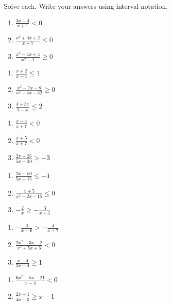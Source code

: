 Solve each. Write your answers using interval notation.
\begin{multicols}{3}
\begin{enumerate}
\setlength\itemsep{10pt}
\item $\frac{3x-4}{x+1}<0$
\item $\frac{x^2+3x+2}{x-7} \leq 0$
\item $\frac{x^2-4x+4}{x^2-1} \geq 0$
\end{enumerate} \setcounter{Review}{\value{enumi}}
\end{multicols}
\begin{multicols}{3}
\begin{enumerate}	\setcounter{enumi}{\value{Review}}
\item $\frac{x+2}{x-4} \leq 1$
\item $\frac{x^2-7x-8}{x^2-4x-32} \geq 0$
\item $\frac{4+3x}{5-x} \leq 2$
\end{enumerate} \setcounter{Review}{\value{enumi}}
\end{multicols}
\begin{multicols}{3}
\begin{enumerate}	\setcounter{enumi}{\value{Review}}
\item $\frac{x-4}{x+7} < 0$
\item $\frac{x+5}{x+7} < 0$
\item $\frac{2x-26}{5x+20} > -3$
\end{enumerate} \setcounter{Review}{\value{enumi}}
\end{multicols}
\begin{multicols}{3}
\begin{enumerate}	\setcounter{enumi}{\value{Review}}
\item $\frac{2x-50}{5x+15} \leq -1$
\item $\frac{x+5}{x^2-2x-15} \leq 0$
\item $-\frac{2}{x} \geq - \frac{3}{x+1}$
\end{enumerate} \setcounter{Review}{\value{enumi}}
\end{multicols}
\begin{multicols}{3}
\begin{enumerate}	\setcounter{enumi}{\value{Review}}
\item $-\frac{3}{x+6} > -\frac{4}{x+7}$
\item $\frac{2x^2+3x-2}{x^2+5x+6} < 0$
\item $\frac{x-4}{2x+4} \geq 1$
\end{enumerate}	\setcounter{Review}{\value{enumi}}
\end{multicols}
\begin{multicols}{3}
\begin{enumerate}	\setcounter{enumi}{\value{Review}}
\item $\frac{6x^2+5x-21}{x-4} < 0$
\item $\frac{2x+1}{4x-3} \geq x-1$
\end{enumerate}	\setcounter{Review}{\value{enumi}}
\end{multicols}

